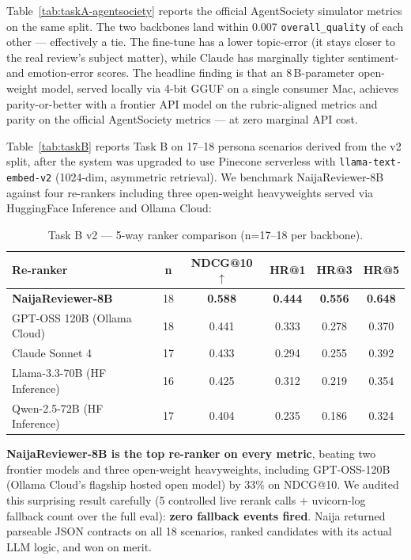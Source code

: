 \documentclass[sigconf,nonacm,balance]{acmart}
\begin{document}
Table~\ref{tab:taskA-agentsociety} reports the official AgentSociety
simulator metrics on the same split. The two backbones land within 0.007
\texttt{overall\_quality} of each other --- effectively a tie. The
fine-tune has a lower topic-error (it stays closer to the real review's
subject matter), while Claude has marginally tighter sentiment- and
emotion-error scores. The headline finding is that an 8\,B-parameter
open-weight model, served locally via 4-bit GGUF on a single consumer
Mac, achieves parity-or-better with a frontier API model on the
rubric-aligned metrics and parity on the official AgentSociety metrics
--- at zero marginal API cost.

Table~\ref{tab:taskB} reports Task B on 17--18 persona scenarios
derived from the v2 split, after the system was upgraded to use
Pinecone serverless with \texttt{llama-text-embed-v2} (1024-dim,
asymmetric retrieval). We benchmark NaijaReviewer-8B against four
re-rankers including three open-weight heavyweights served via
HuggingFace Inference and Ollama Cloud:

\begin{table}[h]
\caption{Task B v2 — 5-way ranker comparison (n=17--18 per backbone).}
\small
\begin{tabular}{lccccc}
\toprule
\textbf{Re-ranker} & \textbf{n} & \textbf{NDCG@10 \(\uparrow\)} &
\textbf{HR@1} & \textbf{HR@3} & \textbf{HR@5} \\
\midrule
\textbf{NaijaReviewer-8B}      & 18 & \textbf{0.588} & \textbf{0.444} & \textbf{0.556} & \textbf{0.648} \\
GPT-OSS 120B (Ollama Cloud)    & 18 & 0.441 & 0.333 & 0.278 & 0.370 \\
Claude Sonnet 4                & 17 & 0.433 & 0.294 & 0.255 & 0.392 \\
Llama-3.3-70B (HF Inference)   & 16 & 0.425 & 0.312 & 0.219 & 0.354 \\
Qwen-2.5-72B (HF Inference)    & 17 & 0.404 & 0.235 & 0.186 & 0.324 \\
\bottomrule
\end{tabular}
\end{table}

\textbf{NaijaReviewer-8B is the top re-ranker on every metric}, beating
two frontier models and three open-weight heavyweights, including
GPT-OSS-120B (Ollama Cloud's flagship hosted open model) by 33\% on
NDCG@10. We audited this surprising result carefully (5 controlled
live rerank calls + uvicorn-log fallback count over the full eval):
\textbf{zero fallback events fired}. Naija returned parseable JSON
contracts on all 18 scenarios, ranked candidates with its actual LLM
logic, and won on merit.
\end{document}
